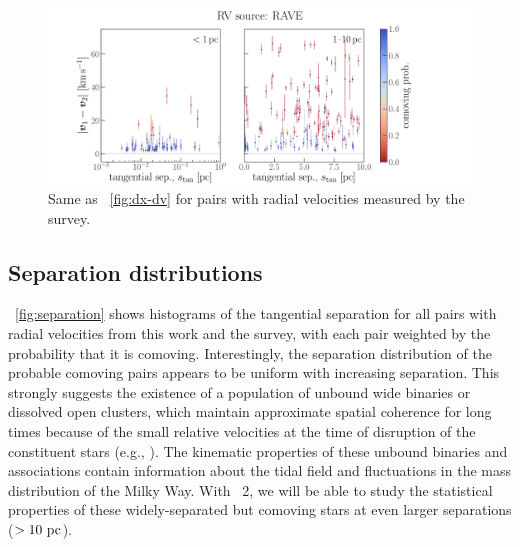 \documentclass[modern, letterpaper]{aastex61}
\newcommand{\gaia}{\project{Gaia}}
\newcommand{\DR}[1]{\acronym{DR}#1}
\begin{document}
\begin{figure}[htb]
  \begin{center}
    \includegraphics[width=0.9\linewidth]{dx-dv-rave.pdf}
  \end{center}
  \caption{%
    Same as \figurename~\ref{fig:dx-dv} for pairs with radial velocities
    measured by the  survey.
    \label{fig:dx-dv-rave}}
\end{figure}

\subsection{Separation distributions}\label{sec:separations}

\figurename~\ref{fig:separation} shows histograms of the tangential separation
for all pairs with radial velocities from this work and the 
survey, with each pair weighted by the probability that it is comoving.
Interestingly, the separation distribution of the probable comoving pairs
appears to be uniform with increasing separation.
This strongly suggests the existence of a population of unbound wide binaries or
dissolved open clusters, which maintain approximate spatial coherence for long
times because of the small relative velocities at the time of disruption of the
constituent stars (e.g., \citealt{Jiang:2010}).
The kinematic properties of these unbound binaries and associations contain
information about the tidal field and fluctuations in the mass distribution of
the Milky Way.
With \gaia\ \DR{2}, we will be able to study the statistical properties of these
widely-separated but comoving stars at even larger separations ($>10~\mathrm{pc}$).
\end{document}
